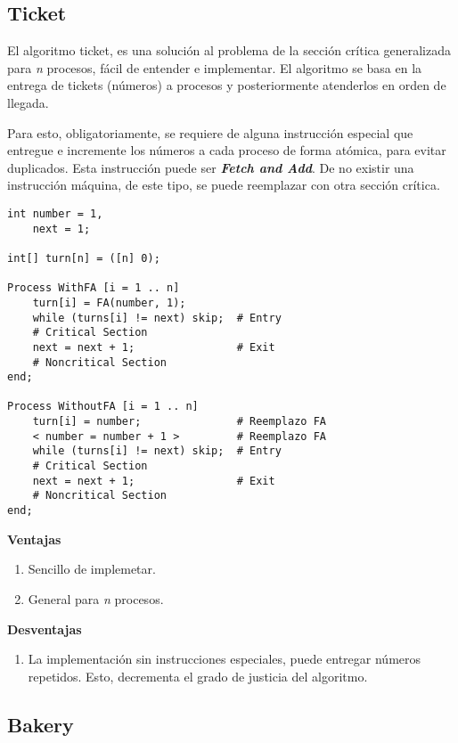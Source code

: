 \documentclass[a4paper, 11pt]{book}
\begin{document}
\subsection{Ticket}

El algoritmo ticket, es una solución al problema de la sección crítica generalizada para \emph{n} procesos, fácil de entender e implementar. El algoritmo se basa en la entrega de tickets (números) a procesos y posteriormente atenderlos en orden de llegada.

Para esto, obligatoriamente, se requiere de alguna instrucción especial que entregue e incremente los números a cada proceso de forma atómica, para evitar duplicados. Esta instrucción puede ser \textbf{\emph{Fetch and Add}}. De no existir una instrucción máquina, de este tipo, se puede reemplazar con otra sección crítica.

\begin{lstlisting}
int number = 1,
    next = 1; 

int[] turn[n] = ([n] 0);

Process WithFA [i = 1 .. n]
    turn[i] = FA(number, 1);
    while (turns[i] != next) skip;  # Entry
    # Critical Section
    next = next + 1;                # Exit
    # Noncritical Section
end;

Process WithoutFA [i = 1 .. n]
    turn[i] = number;               # Reemplazo FA
    < number = number + 1 >         # Reemplazo FA
    while (turns[i] != next) skip;  # Entry
    # Critical Section
    next = next + 1;                # Exit
    # Noncritical Section
end;
\end{lstlisting}

\textbf{Ventajas}
\begin{enumerate}
    \item Sencillo de implemetar.
    \item General para \emph{n} procesos.
\end{enumerate}

\textbf{Desventajas}
\begin{enumerate}
    \item La implementación sin instrucciones especiales, puede entregar números repetidos. Esto, decrementa el grado de justicia del algoritmo.
\end{enumerate}


\subsection{Bakery}
\end{document}
